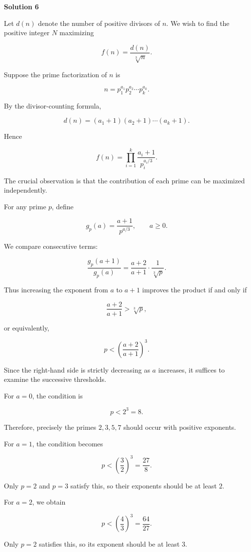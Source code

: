 \begin{enumerate}
 



\textbf{Solution 6}

Let $d(n)$ denote the number of positive divisors of $n$. We wish to find the positive integer $N$ maximizing

 
 \[f(n)=\frac{d(n)}{\sqrt[3]{n}}.\]

 Suppose the prime factorization of $n$ is

 
 \[n=p_1^{a_1}p_2^{a_2}\cdots p_k^{a_k}.\]

 By the divisor-counting formula,

 
 \[d(n)=(a_1+1)(a_2+1)\cdots(a_k+1).\]

 Hence

 
 \[f(n)=\prod_{i=1}^{k}\frac{a_i+1}{p_i^{a_i/3}}.\]

 The crucial observation is that the contribution of each prime can be maximized independently.

 For any prime $p$, define

 
 \[g_p(a)=\frac{a+1}{p^{a/3}},\qquad a\ge0.\]

 We compare consecutive terms:

 
 \[\frac{g_p(a+1)}{g_p(a)}=\frac{a+2}{a+1}\cdot\frac{1}{\sqrt[3]{p}}.\]

 Thus increasing the exponent from $a$ to $a+1$ improves the product if and only if

 
 \[\frac{a+2}{a+1}>\sqrt[3]{p},\]

 or equivalently,

 
 \[\boxed{p<\left(\frac{a+2}{a+1}\right)^3}.\]

 Since the right-hand side is strictly decreasing as $a$ increases, it suffices to examine the successive thresholds.

 For $a=0$, the condition is

 
 \[p<2^3=8.\]

 Therefore, precisely the primes $2,3,5,7$ should occur with positive exponents.

 For $a=1$, the condition becomes

 
 \[p<\left(\frac32\right)^3=\frac{27}{8}.\]

 Only $p=2$ and $p=3$ satisfy this, so their exponents should be at least $2$.

 For $a=2$, we obtain

 
 \[p<\left(\frac43\right)^3=\frac{64}{27}.\]

 Only $p=2$ satisfies this, so its exponent should be at least $3$.


\end{enumerate}

